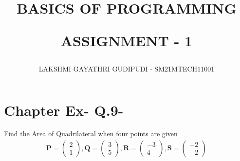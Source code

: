 \documentclass[journal,12pt,twocolumn]{IEEEtran}
\begin{document}
\newcommand{\myvec}[1]{\ensuremath{\begin{pmatrix}#1\end{pmatrix}}}
\newcommand{\cmyvec}[1]{\ensuremath{\begin{pmatrix*}[c]#1\end{pmatrix*}}}
\providecommand{\norm}[1]{\lVert#1\rVert}
\newcommand{\mydet}[1]{\ensuremath{\begin{vmatrix}#1\end{vmatrix}}}
\newcommand{\proj}[2]{\textbf{proj}_{\vec{#1}}\vec{#2}}
\newcommand{\abs}[1]{\left\lvert#1\right\rvert}
\newcommand{\RNum}[1]{\uppercase\expandafter{\romannumeral #1\relax}}
\newcommand{\Rnum}[1]{\lowercase\expandafter{\romannumeral #1\relax}}
\let\StandardTheFigure\thefigure
\let\vec\mathbf

\title{
BASICS OF PROGRAMMING

ASSIGNMENT - 1
}
\author{ LAKSHMI GAYATHRI GUDIPUDI - SM21MTECH11001}
\maketitle
\newpage
\bigskip
\renewcommand{\thefigure}{\theenumi}

\section*{ Chapter \RNum{2} Ex-\RNum{2} Q.9-\Rnum{2}}
\noindent

Find the Area of Quadrilateral when four points are given
\begin{align}
\vec{P} = \myvec{2\\1}, \vec{Q} =\myvec{3\\5},
\vec{R} =\myvec{-3\\4}, \vec{S} =\myvec{-2\\-2}
\end{align}
\noindent
\end{document}
